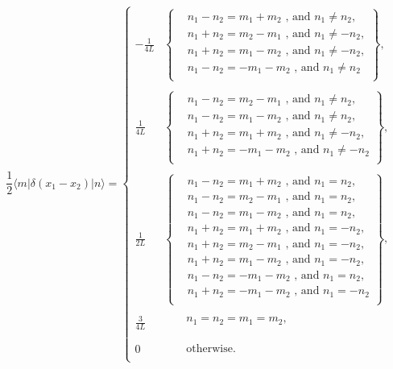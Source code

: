 \begin{equation}
\frac{1}{2} \langle m | \delta(x_1-x_2) | n \rangle =\left\{
\begin{array}{lll}
-\frac{1}{4L} & \left\{ \begin{array}{lll}
 & n_1-n_2=m_1+m_2 \mbox{ , and } n_1\neq n_2,\\
 & n_1+n_2=m_2-m_1 \mbox{ , and } n_1\neq -n_2,\\
 & n_1+n_2=m_1-m_2 \mbox{ , and } n_1\neq -n_2,\\
 & n_1-n_2=-m_1-m_2 \mbox{ , and } n_1\neq n_2\\
 \end{array}\right\}, \\
&  \\
\frac{1}{4L} & \left\{ \begin{array}{lll}
 & n_1-n_2=m_2-m_1 \mbox{ , and } n_1\neq n_2, \\
 & n_1-n_2=m_1-m_2 \mbox{ , and } n_1\neq n_2,\\
 & n_1+n_2=m_1+m_2 \mbox{ , and } n_1\neq -n_2,\\
 & n_1+n_2=-m_1-m_2 \mbox{ , and } n_1\neq -n_2\\
 \end{array} \right\}, \\
 & \\
\frac{1}{2L}& \left\{ \begin{array}{lll}
 &n_1-n_2=m_1+m_2 \mbox{ , and } n_1=n_2, \\
 &n_1-n_2=m_2-m_1 \mbox{ , and } n_1=n_2, \\
 &n_1-n_2=m_1-m_2 \mbox{ , and } n_1=n_2,\\
 &n_1+n_2=m_1+m_2 \mbox{ , and } n_1=-n_2,\\
 &n_1+n_2=m_2-m_1 \mbox{ , and } n_1=-n_2, \\
 &n_1+n_2=m_1-m_2 \mbox{ , and } n_1=-n_2, \\
 &n_1-n_2=-m_1-m_2 \mbox{ , and } n_1=n_2, \\
 &n_1+n_2=-m_1-m_2 \mbox{ , and } n_1=-n_2\\
 \end{array} \right\}, \\
&  \\
\frac{3}{4L} &  \begin{array}{llll}
 & &n_1=n_2=m_1=m_2,\\
\end{array}\\
&  \\
0 &  \begin{array}{llll}
 & &\mbox{otherwise.}\\
 \end{array}
\end{array}
\right.
\end{equation}
